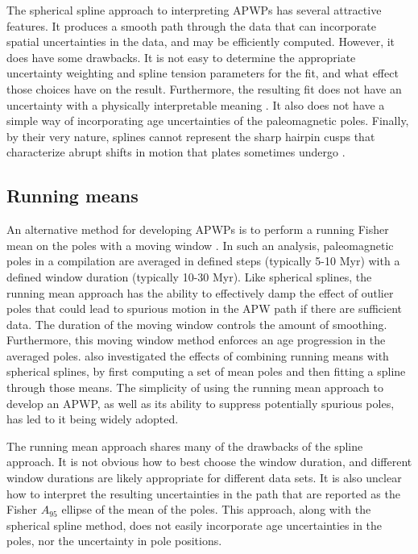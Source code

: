 \documentclass[11pt,letterpaper]{article}
\begin{document}
The spherical spline approach to interpreting APWPs has several attractive features. It produces a smooth path through the data that can incorporate spatial uncertainties in the data, and may be efficiently computed. However, it does have some drawbacks. It is not easy to determine the appropriate uncertainty weighting and spline tension parameters for the fit, and what effect those choices have on the result. Furthermore, the resulting fit does not have an uncertainty with a physically interpretable meaning \citep{Torsvik1996a}. It also does not have a simple way of incorporating age uncertainties of the paleomagnetic poles. Finally, by their very nature, splines cannot represent the sharp hairpin cusps that characterize abrupt shifts in motion that plates sometimes undergo \citep{Irving1972a, Gordon1984a}.

\subsection*{Running means}

An alternative method for developing APWPs is to perform a running Fisher mean on the poles with a moving window \citep{Irving1977a, Van-der-Voo2001a, Torsvik2008a}. In such an analysis, paleomagnetic poles in a compilation are averaged in defined steps (typically 5-10 Myr) with a defined window duration (typically 10-30 Myr). Like spherical splines, the running mean approach has the ability to effectively damp the effect of outlier poles that could lead to spurious motion in the APW path if there are sufficient data. The duration of the moving window controls the amount of smoothing. Furthermore, this moving window method enforces an age progression in the averaged poles. \citet{Torsvik2008a} also investigated the effects of combining running means with spherical splines, by first computing a set of mean poles and then fitting a spline through those means. 
The simplicity of using the running mean approach to develop an APWP, as well as its ability to suppress potentially spurious poles, has led to it being widely adopted.

The running mean approach shares many of the drawbacks of the spline approach.  It is not obvious how to best choose the window duration, and different window durations are likely appropriate for different data sets.  It is also unclear how to interpret the resulting uncertainties in the path that are reported as the Fisher $A_{95}$ ellipse of the mean of the poles. This approach, along with the spherical spline method, does not easily incorporate age uncertainties in the poles, nor the uncertainty in pole positions.
\end{document}
